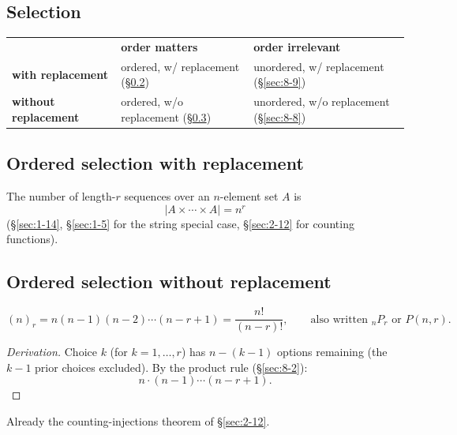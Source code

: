 \documentclass[11pt]{article}
\begin{document}
\subsection{Selection}
\label{sec:8-5}

\begin{note}
\begin{center}
\begin{tabular}{lll}
 & \textbf{order matters} & \textbf{order irrelevant} \\
\textbf{with replacement} & ordered, w/ replacement (\S\ref{sec:8-6}) & unordered, w/ replacement (\S\ref{sec:8-9}) \\
\textbf{without replacement} & ordered, w/o replacement (\S\ref{sec:8-7}) & unordered, w/o replacement (\S\ref{sec:8-8})
\end{tabular}
\end{center}
\end{note}

\subsection{Ordered selection with replacement}
\label{sec:8-6}

\begin{theorem}
The number of length-$r$ sequences over an $n$-element set $A$ is
\[
|A\times\cdots\times A| = n^r
\]
(\S\ref{sec:1-14}, \S\ref{sec:1-5} for the string special case, \S\ref{sec:2-12} for counting functions).
\end{theorem}

\subsection{Ordered selection without replacement}
\label{sec:8-7}

\begin{definition}
\[
(n)_r = n(n-1)(n-2)\cdots(n-r+1) = \frac{n!}{(n-r)!}, \qquad \text{also written } {}_nP_r \text{ or } P(n,r).
\]
\end{definition}
\begin{proof}[Derivation]
Choice $k$ (for $k=1,\dots,r$) has $n-(k-1)$ options remaining (the $k-1$ prior choices excluded). By the product rule (\S\ref{sec:8-2}):
\[
n\cdot(n-1)\cdots(n-r+1).
\]
\end{proof}

\begin{note}
Already the counting-injections theorem of \S\ref{sec:2-12}.
\end{note}
\end{document}
